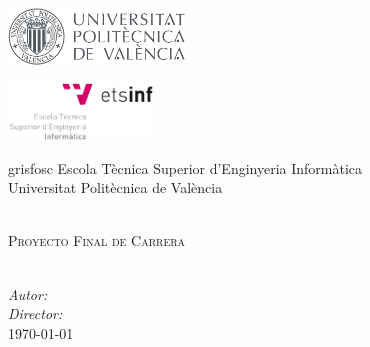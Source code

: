 
\begin{titlepage}
\begin{center}

\begin{minipage}{0.49\linewidth}
\begin{flushleft}
\includegraphics[height=1.5cm]{./logo-upv}
\end{flushleft}
\end{minipage}
\begin{minipage}{0.49\linewidth}
\begin{flushright}
\includegraphics[height=1.5cm]{./logo-etsinf}
\end{flushright}
\end{minipage}

\vspace{2cm}

\begin{color}{grisfosc}
\large
Escola Tècnica Superior d'Enginyeria Informàtica\\[0.2cm]
Universitat Politècnica de València\\[1.9cm]
\end{color}

{\LARGE \bfseries \titulo}\\[1.5cm]
\textsc{\large Proyecto Final de Carrera}\\[0.4cm]
\textcolor{grisclar}{\large\titulacion}\\[5.0cm]

\begin{flushright} \large
\emph{Autor:} \autor\\[0.4cm]
\emph{Director:} \director\\[0.6cm]
\today
\end{flushright}


\end{center}

\end{titlepage}
